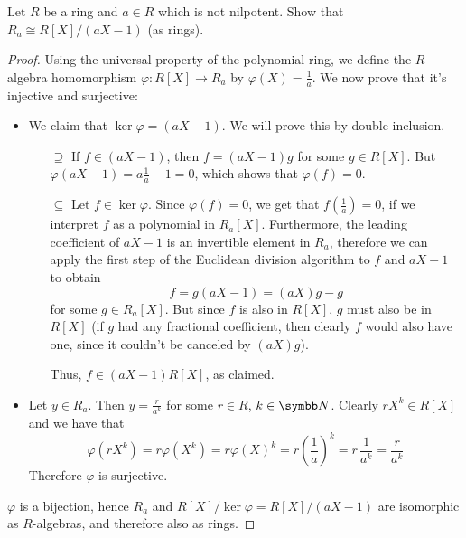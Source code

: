 \begin{problem*}{4}
Let \(R\) be a ring and \(a \in R\) which is not nilpotent. Show that \(R_a \cong R[X]/(aX - 1)\) (as rings).
\begin{proof}
Using the universal property of the polynomial ring, we define the \(R\)-algebra homomorphism \(\varphi \colon R[X] \to R_a\) by \(\varphi(X) = \frac{1}{a}\). We now prove that it's injective and surjective:
\begin{itemize}
    \item We claim that \(\ker \varphi = (aX - 1)\). We will prove this by double inclusion.
    
    \begin{itemize}
        \item[\(\supseteq\)] If \(f \in (aX - 1)\), then \(f = (aX - 1) g\) for some \(g \in R[X]\). But \(\varphi(aX - 1) = a \frac{1}{a} - 1 = 0\), which shows that \(\varphi(f) = 0\).
        
        \item[\(\subseteq\)] Let \(f \in \ker \varphi\). Since \(\varphi(f) = 0\), we get that \(f\left(\frac{1}{a}\right) = 0\), if we interpret \(f\) as a polynomial in \(R_a[X]\). Furthermore, the leading coefficient of \(aX - 1\) is an invertible element in \(R_a\), therefore we can apply the first step of the Euclidean division algorithm to \(f\) and \(aX - 1\) to obtain
        \[
            f = g (aX - 1) = (a X) g - g
        \]
        for some \(g \in R_a[X]\). But since \(f\) is also in \(R[X]\), \(g\) must also be in \(R[X]\) (if \(g\) had any fractional coefficient, then clearly \(f\) would also have one, since it couldn't be canceled by \((aX) g\)).
        
        Thus, \(f \in (aX - 1) R[X]\), as claimed.
    \end{itemize}

    \item Let \(y \in R_a\). Then \(y = \frac{r}{a^k}\) for some \(r \in R\), \(k \in \naturals\). Clearly \(r X^k \in R[X]\) and we have that
    \[
        \varphi\left(r X^k\right) = r \varphi\left(X^k\right) = r \varphi(X)^k = r \left(\frac{1}{a}\right)^k = r \, \frac{1}{a^k} = \frac{r}{a^k}
    \]
    Therefore \(\varphi\) is surjective.
\end{itemize}

\(\varphi\) is a bijection, hence \(R_a\) and \(R[X]/\ker \varphi = R[X]/(aX - 1)\) are isomorphic as \(R\)-algebras, and therefore also as rings.
\end{proof}
\end{problem*}


